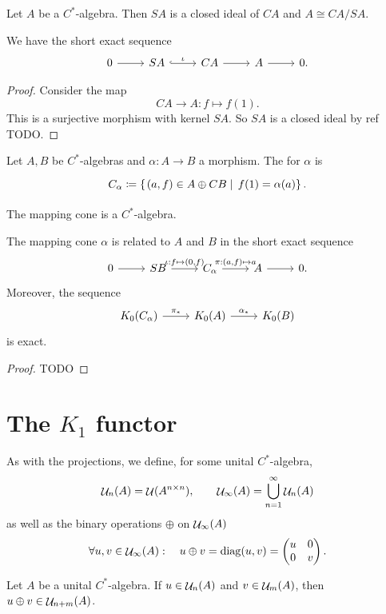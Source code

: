 \begin{lemma} \label{exactSequenceSuspensionCone}
Let $A$ be a $C^*$-algebra. Then $SA$ is a closed ideal of $CA$ and $A \cong CA/SA$.

We have the short exact sequence
\[ \begin{tikzcd}
 0 \rar & SA \rar[hook, "\iota"] & CA \rar & A \rar & 0.
\end{tikzcd} \]
\end{lemma}
\begin{proof}
Consider the map
\[ CA \to A: f\mapsto f(1). \]
This is a surjective morphism with kernel $SA$. So $SA$ is a closed ideal by ref TODO.
\end{proof}


\begin{definition}
Let $A,B$ be $C^*$-algebras and $\alpha: A\to B$ a morphism. The  for $\alpha$ is
\[ \begin{tikzcd}
C_\alpha \defeq \setbuilder{(a, f) \in A\oplus CB}{f(1) = \alpha(a)}.
\end{tikzcd} \]
\end{definition}
The mapping cone is a $C^*$-algebra.

\begin{lemma}
The mapping cone $\alpha$ is related to $A$ and $B$ in the short exact sequence
\[ \begin{tikzcd}
0 \rar & SB \rar{\iota: f\mapsto (0,f)} & C_\alpha \rar{\pi: (a,f) \mapsto a} & A \rar & 0.
\end{tikzcd} \]
Moreover, the sequence
\[ \begin{tikzcd}
K_0(C_\alpha) \rar{\pi_*} & K_0(A) \rar{\alpha_*} & K_0(B)
\end{tikzcd} \]
is exact.
\end{lemma}
\begin{proof}
TODO
\end{proof}


\section{The $K_1$ functor}
\begin{definition}
As with the projections, we define, for some unital $C^*$-algebra,
\[ \mathop{\mathcal{U}}\nolimits_n(A) = \mathop{\mathcal{U}}\nolimits(A^{n\times n}), \qquad \mathop{\mathcal{U}}\nolimits_\infty(A) = \bigcup^\infty_{n=1}\mathop{\mathcal{U}}\nolimits_n(A) \]
as well as the binary operations $\oplus$ on $\mathop{\mathcal{U}}\nolimits_\infty(A)$
\[ \forall u,v \in \mathop{\mathcal{U}}\nolimits_\infty(A): \quad u\oplus v = \operatorname{diag}(u,v) = \begin{pmatrix}
u & 0 \\ 0 & v
\end{pmatrix}. \]
\end{definition}
\begin{lemma}
Let $A$ be a unital $C^*$-algebra. If $u\in\mathop{\mathcal{U}}\nolimits_n(A)$ and $v\in\mathop{\mathcal{U}}\nolimits_m(A)$, then $u\oplus v\in\mathop{\mathcal{U}}\nolimits_{n+m}(A)$.
\end{lemma}
